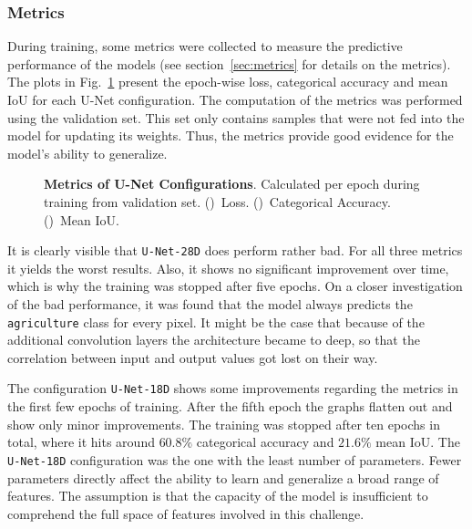 \subsubsection{Metrics}
During training, some metrics were collected to measure the predictive performance of the models (see section~\ref{sec:metrics} for details on the metrics). The plots in Fig.~\ref{fig:unet_train_metrics} present the epoch-wise loss, categorical accuracy and mean IoU for each U-Net configuration. The computation of the metrics was performed using the validation set. This set only contains samples that were not fed into the model for updating its weights. Thus, the metrics provide good evidence for the model's ability to generalize.

\begin{figure}
    \newcommand{\UnetMetricsImageWidth}{0.32\textwidth}
    \centering
    
    \caption[Metrics of U-Net Configurations]
    {\textbf{Metrics of U-Net Configurations}. Calculated per epoch during training from validation set. ()~Loss. ()~Categorical Accuracy. ()~Mean IoU. }
    \label{fig:unet_train_metrics}
\end{figure}

It is clearly visible that \texttt{U-Net-28D} does perform rather bad. For all three metrics it yields the worst results. Also, it shows no significant improvement over time, which is why the training was stopped after five epochs. On a closer investigation of the bad performance, it was found that the model always predicts the \texttt{agriculture} class for every pixel. It might be the case that because of the additional convolution layers the architecture became to deep, so that the correlation between input and output values got lost on their way.

The configuration \texttt{U-Net-18D} shows some improvements regarding the metrics in the first few epochs of training. After the fifth epoch the graphs flatten out and show only minor improvements. The training was stopped after ten epochs in total, where it hits around $60.8\%$ categorical accuracy and $21.6\%$ mean IoU. The \texttt{U-Net-18D} configuration was the one with the least number of parameters. Fewer parameters directly affect the ability to learn and generalize a broad range of features. The assumption is that the capacity of the model is insufficient to comprehend the full space of features involved in this challenge.

